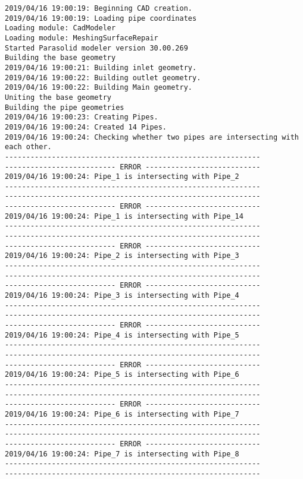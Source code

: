 \documentclass{article}
\begin{document}
{\tiny 
\begin{verbatim}
2019/04/16 19:00:19: Beginning CAD creation.
2019/04/16 19:00:19: Loading pipe coordinates
Loading module: CadModeler
Loading module: MeshingSurfaceRepair
Started Parasolid modeler version 30.00.269
Building the base geometry
2019/04/16 19:00:21: Building inlet geometry.
2019/04/16 19:00:22: Building outlet geometry.
2019/04/16 19:00:22: Building Main geometry.
Uniting the base geometry
Building the pipe geometries
2019/04/16 19:00:23: Creating Pipes.
2019/04/16 19:00:24: Created 14 Pipes.
2019/04/16 19:00:24: Checking whether two pipes are intersecting with each other.
------------------------------------------------------------
-------------------------- ERROR ---------------------------
2019/04/16 19:00:24: Pipe_1 is intersecting with Pipe_2
------------------------------------------------------------
------------------------------------------------------------
-------------------------- ERROR ---------------------------
2019/04/16 19:00:24: Pipe_1 is intersecting with Pipe_14
------------------------------------------------------------
------------------------------------------------------------
-------------------------- ERROR ---------------------------
2019/04/16 19:00:24: Pipe_2 is intersecting with Pipe_3
------------------------------------------------------------
------------------------------------------------------------
-------------------------- ERROR ---------------------------
2019/04/16 19:00:24: Pipe_3 is intersecting with Pipe_4
------------------------------------------------------------
------------------------------------------------------------
-------------------------- ERROR ---------------------------
2019/04/16 19:00:24: Pipe_4 is intersecting with Pipe_5
------------------------------------------------------------
------------------------------------------------------------
-------------------------- ERROR ---------------------------
2019/04/16 19:00:24: Pipe_5 is intersecting with Pipe_6
------------------------------------------------------------
------------------------------------------------------------
-------------------------- ERROR ---------------------------
2019/04/16 19:00:24: Pipe_6 is intersecting with Pipe_7
------------------------------------------------------------
------------------------------------------------------------
-------------------------- ERROR ---------------------------
2019/04/16 19:00:24: Pipe_7 is intersecting with Pipe_8
------------------------------------------------------------
------------------------------------------------------------

\end{verbatim}}
\end{document}
